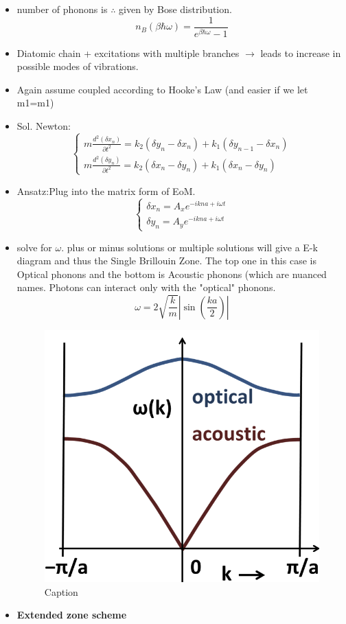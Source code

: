 \begin{itemize}
    \item number of phonons is $\therefore$ given by Bose distribution.
    \[n_B (\beta \hbar\omega) = \frac{1}{e^{\beta \hbar\omega} -1 } \]
    \item Diatomic chain + excitations with multiple branches
    $\rightarrow$ leads to increase in possible modes of vibrations.
    \item Again assume coupled according to Hooke's Law (and easier if we let m1=m1)
    \item Sol. Newton:
    \[\begin{cases}
      m \frac{d^2(\delta x_n)}{\partial t^2} = k_2 (\delta y_n - \delta x_n)+ k_1 (\delta y_{n-1} - \delta x_n)\\
      m \frac{d^2(\delta y_n)}{\partial t^2} = k_2 (\delta x_n - \delta y_n)+ k_1 (\delta x_{n} - \delta y_n)
    \end{cases} \]
    \item Ansatz:Plug into the matrix form of EoM.
    \[\begin{cases}
    \delta x_n = A_x e^{-ikna+i\omega t} \\
    \delta y_n = A_y e^{-ikna+i\omega t}
    \end{cases}\]
    \item solve for $\omega$. plus or minus solutions or multiple solutions will give a E-k diagram and thus the Single Brillouin Zone. The top one in this case is Optical phonons and the bottom is Acoustic phonons (which are nuanced names. Photons can interact only with the "optical" phonons. 
    \[\omega = 2 \sqrt{\frac{k}{m}} \left| \sin\left(\frac{ka}{2}\right)\right| \]
    \begin{figure}
        \centering
        \includegraphics[width = 0.5\linewidth]{Images/phonon_modes.png}
        \caption{Caption}
        \label{fig:phonon modes}
    \end{figure}
    \item \textbf{Extended zone scheme}

\end{itemize}
